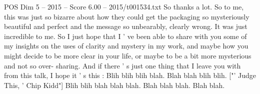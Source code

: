 \begin{textsample}{POS Dim 5 – 2015 – Score 6.00 – 2015/t001534.txt}
So thanks a lot.
So to me, this was just so bizarre about how they could get the packaging so mysteriously beautiful and perfect and the message so unbearably, clearly wrong.
It was just incredible to me.
So I just hope that I ' ve been able to share with you some of my insights on the uses of clarity and mystery in my work, and maybe how you might decide to be more clear in your life, or maybe to be a bit more mysterious and not so over- sharing.
And if there ' s just one thing that I leave you with from this talk, I hope it ' s this : Blih blih blih blah.
Blah blah blih blih. ["' Judge This, ' Chip Kidd"] Blih blih blah blah blah.
Blah blah blah.
Blah blah.

\end{textsample}
